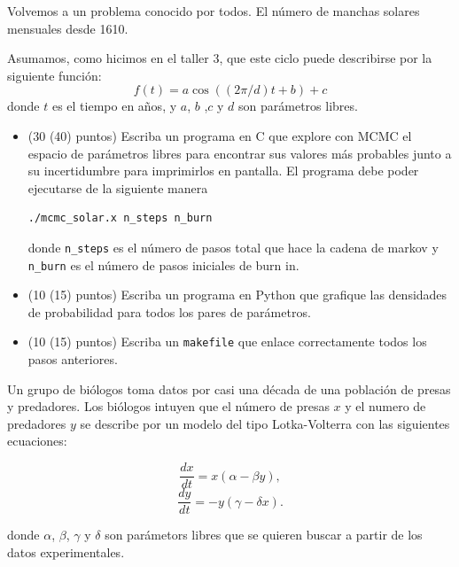 \documentclass[11pt,letterpaper]{exam}
\begin{document}
\begin{questions}

Volvemos a un problema conocido por todos.  El n\'umero de manchas
solares mensuales desde 1610. 



Asumamos, como hicimos en el taller 3, que este ciclo puede describirse por la siguiente funci\'on:
\begin{displaymath}
f(t) = a\cos((2\pi/d) t + b) + c
\end{displaymath}
donde $t$ es el tiempo en a\~nos, y $a$, $b$ ,$c$ y $d$ son par\'ametros libres.
\begin{itemize}

\item (30 (40) puntos) Escriba un programa en C que explore con MCMC
  el espacio de par\'ametros libres para encontrar sus valores m\'as
  probables junto a su incertidumbre para imprimirlos en pantalla.
  El programa debe poder ejecutarse de la siguiente manera 
\begin{verbatim}
./mcmc_solar.x n_steps n_burn
\end{verbatim}
donde \verb"n_steps" es el n\'umero de pasos total que hace la cadena
de markov y \verb"n_burn" es el n\'umero de pasos iniciales de burn
in.

\item (10 (15) puntos) Escriba un programa en Python que grafique las
  densidades de probabilidad para todos los pares de par\'ametros.

\item (10 (15) puntos) Escriba un \verb"makefile" que enlace correctamente
  todos los pasos anteriores.
\end{itemize}





Un grupo de bi\'ologos toma datos por casi una d\'ecada de una
poblaci\'on de presas y predadores. Los bi\'ologos intuyen que el
n\'umero de presas $x$ y el numero de predadores $y$ se describe por
un modelo del tipo Lotka-Volterra con las siguientes ecuaciones:

\begin{equation}
\frac{dx}{dt}=x(\alpha - \beta y),
\end{equation}
\begin{equation}
\frac{dy}{dt}=-y(\gamma -\delta x).
\end{equation}

donde $\alpha$, $\beta$, $\gamma$ y $\delta$ son par\'ametors libres
que se quieren buscar a partir de los datos experimentales.


\end{questions}
\end{document}
